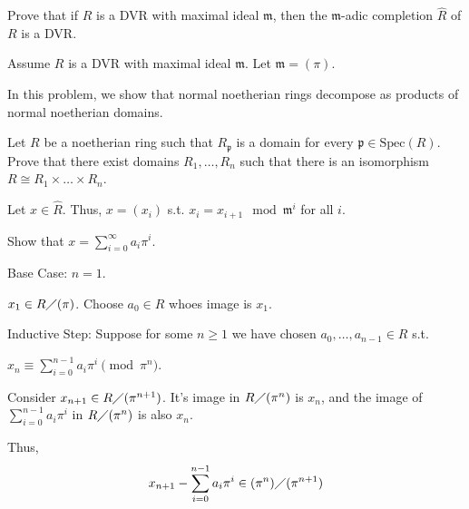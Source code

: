 \documentclass[12pt, letterpaper]{article}
\newcommand{\p}{\mathfrak{p}}
\newcommand{\Spec}{\mathrm{Spec}}
\newcommand{\mf}[1]{\mathfrak{#1}}
\begin{document}
\begin{problem}{}
    Prove that if $R$ is a DVR with maximal ideal $\mf{m}$, then the $\mf{m}$-adic completion $\widehat{R}$ of $R$ is a
DVR.
\end{problem}
\begin{problemproof}
    Assume $R$ is a DVR with maximal ideal $\mf{m}$. Let $\mf{m}=(\pi)$.
\end{problemproof}

\begin{problem}{}
    In this problem, we show that normal noetherian rings decompose as products of normal
noetherian domains.
\end{problem}
\begin{subproblem}{}
    Let $R$ be a noetherian ring such that $R_\p$ is a domain for every $\p \in \Spec(R)$. Prove that
there exist domains $R_1, \dots , R_n$ such that there is an isomorphism $R \cong R_1 \times \dots \times R_n$.
\end{subproblem}
\begin{problemproof}
    Let $x \in \widehat{R}$. Thus, $x=(x_i)$ s.t. $x_i = x_{i+1} \mod \mf{m}^i$ for all $i$.

    Show that $x= \sum_{i=0}^\infty a_i \pi^i$.

    Base Case: $n=1$.

    $x_1 \in R \diagup (\pi)$. Choose $a_0 \in R$ whoes image is $x_1$.

    Inductive Step: Suppose for some $n \geq 1$ we have chosen $a_0,\dots,a_{n-1} \in R $ s.t. 
    
    $x_n \equiv \sum_{i=0}^{n-1} a_i \pi^i \pmod{\pi^n}$.

    Consider $x_{n+1} \in R \diagup (\pi^{n+1})$. It's image in $R \diagup (\pi^n)$ is $x_n$, and the image of $\sum_{i=0}^{n-1} a_i \pi^i$ in $R \diagup (\pi^n)$ is also $x_n$.

    Thus,
    \[x_{n+1} - \sum_{i=0}^{n-1} a_i \pi^i \in (\pi^n) \diagup (\pi^{n+1})\]
    
\end{problemproof}
\end{document}
